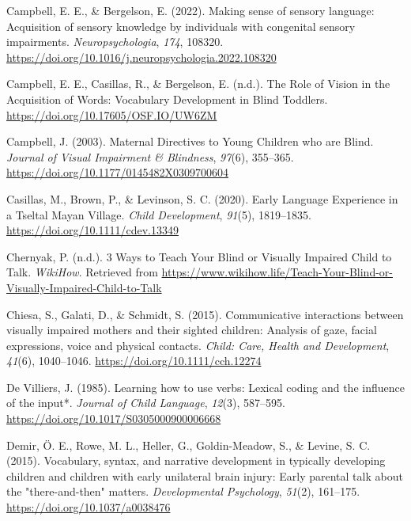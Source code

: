 \documentclass[
  man]{apa6}
\newlength{\cslhangindent}
\newlength{\cslentryspacingunit} %
\newenvironment{CSLReferences}[2] %
 {%
  \setlength{\parindent}{0pt}
  \ifodd #1
  \let\oldpar\par
  \def\par{\hangindent=\cslhangindent\oldpar}
  \fi
  \setlength{\parskip}{#2\cslentryspacingunit}
 }%
 {}
\begin{document}
\begin{CSLReferences}{1}{0}
\leavevmode{}%
Campbell, E. E., \& Bergelson, E. (2022). Making sense of sensory language: {Acquisition} of sensory knowledge by individuals with congenital sensory impairments. \emph{Neuropsychologia}, \emph{174}, 108320. \url{https://doi.org/10.1016/j.neuropsychologia.2022.108320}

\leavevmode{}%
Campbell, E. E., Casillas, R., \& Bergelson, E. (n.d.). The {Role} of {Vision} in the {Acquisition} of {Words}: {Vocabulary} {Development} in {Blind} {Toddlers}. \url{https://doi.org/10.17605/OSF.IO/UW6ZM}

\leavevmode{}%
Campbell, J. (2003). Maternal {Directives} to {Young} {Children} who are {Blind}. \emph{Journal of Visual Impairment \& Blindness}, \emph{97}(6), 355--365. \url{https://doi.org/10.1177/0145482X0309700604}

\leavevmode{}%
Casillas, M., Brown, P., \& Levinson, S. C. (2020). Early {Language} {Experience} in a {Tseltal} {Mayan} {Village}. \emph{Child Development}, \emph{91}(5), 1819--1835. \url{https://doi.org/10.1111/cdev.13349}

\leavevmode{}%
Chernyak, P. (n.d.). 3 {Ways} to {Teach} {Your} {Blind} or {Visually} {Impaired} {Child} to {Talk}. \emph{WikiHow}. Retrieved from \url{https://www.wikihow.life/Teach-Your-Blind-or-Visually-Impaired-Child-to-Talk}

\leavevmode{}%
Chiesa, S., Galati, D., \& Schmidt, S. (2015). Communicative interactions between visually impaired mothers and their sighted children: Analysis of gaze, facial expressions, voice and physical contacts. \emph{Child: Care, Health and Development}, \emph{41}(6), 1040--1046. \url{https://doi.org/10.1111/cch.12274}

\leavevmode{}%
De Villiers, J. (1985). Learning how to use verbs: Lexical coding and the influence of the input*. \emph{Journal of Child Language}, \emph{12}(3), 587--595. \url{https://doi.org/10.1017/S0305000900006668}

\leavevmode{}%
Demir, Ö. E., Rowe, M. L., Heller, G., Goldin-Meadow, S., \& Levine, S. C. (2015). Vocabulary, syntax, and narrative development in typically developing children and children with early unilateral brain injury: Early parental talk about the "there-and-then" matters. \emph{Developmental Psychology}, \emph{51}(2), 161--175. \url{https://doi.org/10.1037/a0038476}


\end{CSLReferences}
\end{document}
